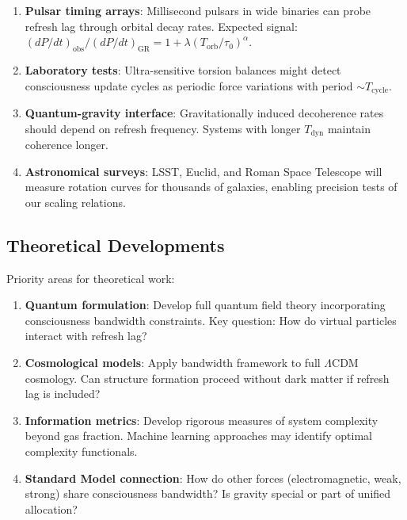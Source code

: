 \documentclass[twocolumn,prd,amsmath,amssymb,aps,superscriptaddress,nofootinbib]{revtex4-2}
\begin{document}
\begin{enumerate}
\item \textbf{Pulsar timing arrays}: Millisecond pulsars in wide binaries can probe refresh lag through orbital decay rates. Expected signal: $(dP/dt)_{\text{obs}} / (dP/dt)_{\text{GR}} = 1 + \lambda(T_{\text{orb}}/\tau_0)^\alpha$.

\item \textbf{Laboratory tests}: Ultra-sensitive torsion balances might detect consciousness update cycles as periodic force variations with period $\sim T_{\text{cycle}}$.

\item \textbf{Quantum-gravity interface}: Gravitationally induced decoherence rates should depend on refresh frequency. Systems with longer $T_{\text{dyn}}$ maintain coherence longer.

\item \textbf{Astronomical surveys}: LSST, Euclid, and Roman Space Telescope will measure rotation curves for thousands of galaxies, enabling precision tests of our scaling relations.
\end{enumerate}

\subsection{Theoretical Developments}

Priority areas for theoretical work:

\begin{enumerate}
\item \textbf{Quantum formulation}: Develop full quantum field theory incorporating consciousness bandwidth constraints. Key question: How do virtual particles interact with refresh lag?

\item \textbf{Cosmological models}: Apply bandwidth framework to full $\Lambda$CDM cosmology. Can structure formation proceed without dark matter if refresh lag is included?

\item \textbf{Information metrics}: Develop rigorous measures of system complexity beyond gas fraction. Machine learning approaches may identify optimal complexity functionals.

\item \textbf{Standard Model connection}: How do other forces (electromagnetic, weak, strong) share consciousness bandwidth? Is gravity special or part of unified allocation?
\end{enumerate}
\end{document}
